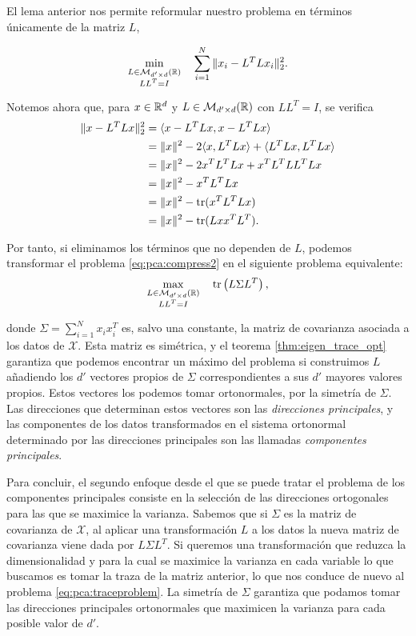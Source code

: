 El lema anterior nos permite reformular nuestro problema en términos únicamente de la matriz $L$,

\begin{equation} \label{eq:pca:compress2}
    \min_{\substack{L \in \mathcal{M}_{d'\times d}(\mathbb{R}) \\LL^T = I}} \quad \sum_{i=1}^{N} \|x_i - L^TLx_i\|_2^2.
\end{equation}

Notemos ahora que, para $x \in \mathbb{R}^d$ y $L \in \mathcal{M}_{d'\times d}(\mathbb{R})$ con $LL^T = I$, se verifica
\begin{align*}
    \|x - L^TLx\|_2^2 &= \langle x - L^TLx, x - L^TLx \rangle \\
                      &= \|x\|^2 - 2\langle x,L^TLx \rangle + \langle L^TLx, L^TLx \rangle \\
                      &= \|x\|^2 - 2x^TL^TLx + x^TL^TLL^TLx \\
                      &= \|x\|^2 - x^TL^TLx \\
                      &= \|x\|^2 - \operatorname{tr}(x^TL^TLx) \\
                      &= \|x\|^2 - \operatorname{tr}(Lxx^TL^T).
\end{align*}

Por tanto, si eliminamos los términos que no dependen de $L$, podemos transformar el problema \ref{eq:pca:compress2} en el siguiente problema equivalente:
\begin{equation} \label{eq:pca:traceproblem}
    \max_{\substack{L \in \mathcal{M}_{d'\times d}(\mathbb{R}) \\LL^T = I}} \quad \operatorname{tr}\left(L \Sigma L^T\right),
\end{equation}

donde $\Sigma = \sum_{i=1}^N x_ix_i^T$ es, salvo una constante, la matriz de covarianza asociada a los datos de $\mathcal{X}$. Esta matriz es simétrica, y el teorema \ref{thm:eigen_trace_opt} garantiza que podemos encontrar un máximo del problema si construimos $L$ añadiendo los $d'$ vectores propios de $\Sigma$ correspondientes a sus $d'$ mayores valores propios. Estos vectores los podemos tomar ortonormales, por la simetría de $\Sigma$. Las direcciones que determinan estos vectores son las \emph{direcciones principales}, y las componentes de los datos transformados en el sistema ortonormal determinado por las direcciones principales son las llamadas \emph{componentes principales}.

Para concluir, el segundo enfoque desde el que se puede tratar el problema de los componentes principales consiste en la selección de las direcciones ortogonales para las que se maximice la varianza. Sabemos que si $\Sigma$ es la matriz de covarianza de $\mathcal{X}$, al aplicar una transformación $L$ a los datos la nueva matriz de covarianza viene dada por $L\Sigma L^T$. Si queremos una transformación que reduzca la dimensionalidad y para la cual se maximice la varianza en cada variable lo que buscamos es tomar la traza de la matriz anterior, lo que nos conduce de nuevo al problema \ref{eq:pca:traceproblem}. La simetría de $\Sigma$ garantiza que podamos tomar las direcciones principales ortonormales que maximicen la varianza para cada posible valor de $d'$.

